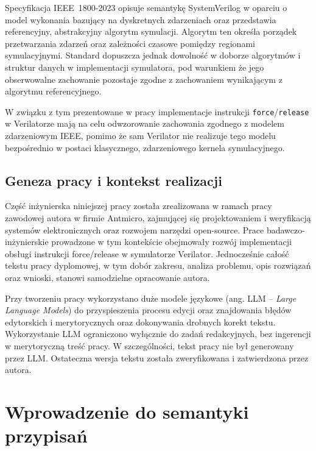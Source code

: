 \documentclass[shortabstract, inz]{iithesis}
\begin{document}
Specyfikacja IEEE~1800-2023\cite{IEEE1800-2023} opisuje semantykę SystemVerilog w oparciu o model wykonania bazujący na dyskretnych zdarzeniach oraz przedstawia referencyjny, abstrakcyjny algorytm symulacji. Algorytm ten określa porządek przetwarzania zdarzeń oraz zależności czasowe pomiędzy regionami symulacyjnymi. Standard dopuszcza jednak dowolność w doborze algorytmów i struktur danych w implementacji symulatora, pod warunkiem że jego obserwowalne zachowanie pozostaje zgodne z zachowaniem wynikającym z algorytmu referencyjnego.

W związku z tym prezentowane w pracy implementacje instrukcji \texttt{force}/\texttt{release} w Verilatorze mają na celu odwzorowanie zachowania zgodnego z modelem zdarzeniowym IEEE, pomimo że sam Verilator nie realizuje tego modelu bezpośrednio w postaci klasycznego, zdarzeniowego kernela symulacyjnego.

\section{Geneza pracy i kontekst realizacji}
Część inżynierska niniejszej pracy została zrealizowana w ramach pracy zawodowej autora w firmie Antmicro, zajmującej się projektowaniem i weryfikacją systemów elektronicznych oraz rozwojem narzędzi open-source. Prace badawczo-inżynierskie prowadzone w tym kontekście obejmowały rozwój implementacji obsługi instrukcji force/release w symulatorze Verilator. Jednocześnie całość tekstu pracy dyplomowej, w tym dobór zakresu, analiza problemu, opis rozwiązań oraz wnioski, stanowi samodzielne opracowanie autora.

Przy tworzeniu pracy wykorzystano duże modele językowe (ang. LLM -- \textit{Large Language Models}) do przyspieszenia procesu edycji oraz znajdowania błędów edytorskich i merytorycznych oraz dokonywania drobnych korekt tekstu. Wykorzystanie LLM ograniczono wyłącznie do zadań redakcyjnych, bez ingerencji w merytoryczną treść pracy. W szczególności, tekst pracy nie był generowany przez LLM. Ostateczna wersja tekstu została zweryfikowana i zatwierdzona przez autora.

\thispagestyle{verilatornote}

\chapter{Wprowadzenie do semantyki przypisań}
\end{document}

